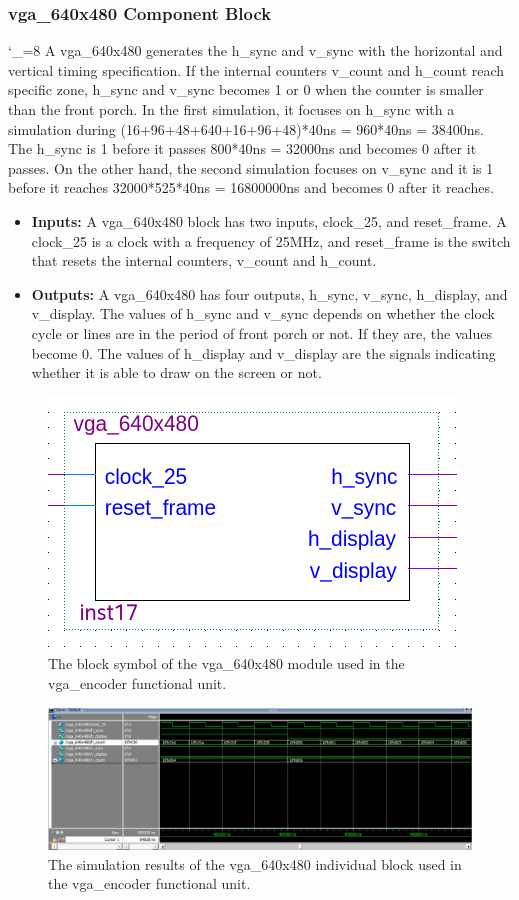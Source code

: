 \documentclass[a4paper]{article}
\begin{document}
\subsubsection{vga_640x480 Component Block}
\catcode`_=8
A vga\_640x480 generates the h\_sync and v\_sync with the horizontal and vertical timing specification. If the internal counters v\_count and h\_count reach specific zone, h\_sync and v\_sync becomes 1 or 0 when the counter is smaller than the front porch. In the first simulation, it focuses on h\_sync with a simulation during (16+96+48+640+16+96+48)*40ns = 960*40ns = 38400ns. The h\_sync is 1 before it passes 800*40ns = 32000ns and becomes 0 after it passes. On the other hand, the second simulation focuses on v\_sync and it is 1 before it reaches 32000*525*40ns = 16800000ns and becomes 0 after it reaches.
\begin{itemize}
\item \textbf{Inputs:  } A vga\_640x480 block has two inputs, clock\_25, and reset\_frame. A clock\_25 is a clock with a frequency of 25MHz, and reset\_frame is the switch that resets the internal counters, v\_count and h\_count.
\item \textbf{Outputs: }  A vga\_640x480 has four outputs, h\_sync, v\_sync, h\_display, and v\_display. The values of h\_sync and v\_sync depends on whether the clock cycle or lines are in the period of front porch or not. If they are, the values become 0. The values of h\_display and v\_display are the signals indicating whether it is able to draw on the screen or not.

\end{itemize}
\begin{figure}[h]
\centering
\includegraphics[width=.48\textwidth]{functional_units/vga_encoder/individual_blocks/vga_640x480_symbol.png}
\caption{The block symbol of the vga\_640x480 module used in the vga\_encoder functional unit.}
\end{figure}
\begin{figure}[h]
  \centering
  \includegraphics[width=.98\textwidth]{functional_units/vga_encoder/individual_blocks/vga_640x480_sim.png}
  \caption{The simulation results of the vga\_640x480 individual block used in the vga\_encoder functional unit.}
    \label{fig:individual-1-2-sim}
\end{figure}
\end{document}
